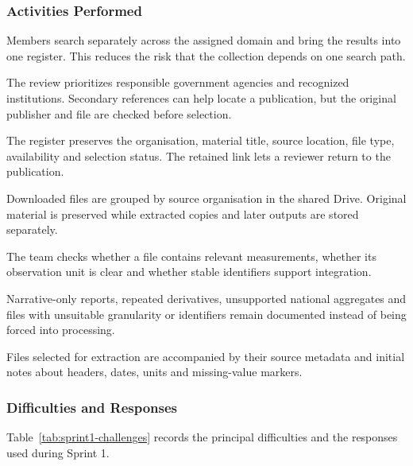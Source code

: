\subsubsection{Activities Performed}

\begin{description}[style=nextline]
  \item[Independent source searching.] Members search separately across the
  assigned domain and bring the results into one register. This reduces the
  risk that the collection depends on one search path.
  \item[Official-source checking.] The review prioritizes responsible
  government agencies and recognized institutions. Secondary references can
  help locate a publication, but the original publisher and file are checked
  before selection.
  \item[Source recording.] The register preserves the organisation, material
  title, source location, file type, availability and selection status. The
  retained link lets a reviewer return to the publication.
  \item[Collection and organisation.] Downloaded files are grouped by source
  organisation in the shared Drive. Original material is preserved while
  extracted copies and later outputs are stored separately.
  \item[Scope and structure screening.] The team checks whether a file contains
  relevant measurements, whether its observation unit is clear and whether
  stable identifiers support integration.
  \item[Exclusion recording.] Narrative-only reports, repeated derivatives,
  unsupported national aggregates and files with unsuitable granularity or
  identifiers remain documented instead of being forced into processing.
  \item[Handoff preparation.] Files selected for extraction are accompanied by
  their source metadata and initial notes about headers, dates, units and
  missing-value markers.
\end{description}

\subsubsection{Difficulties and Responses}

Table~\ref{tab:sprint1-challenges} records the principal difficulties and the
responses used during Sprint 1.

